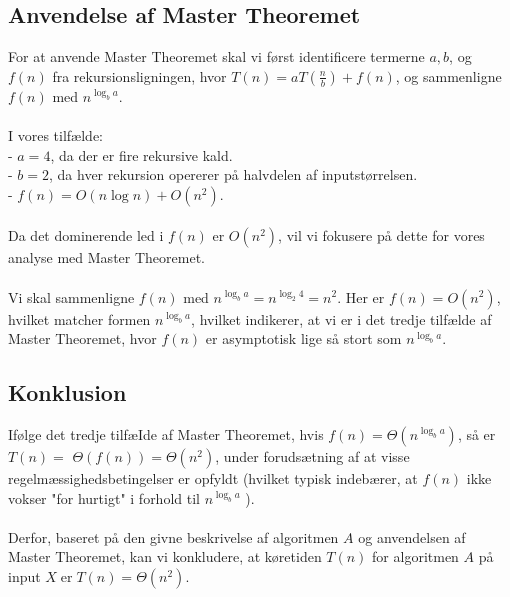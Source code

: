\documentclass{article}
\begin{document}
\subsection{Anvendelse af Master Theoremet}
For at anvende Master Theoremet skal vi først identificere termerne $a, b$, og $f(n)$ fra rekursionsligningen, hvor $T(n)=a T\left(\frac{n}{b}\right)+f(n)$, og sammenligne $f(n)$ med $n^{\log _b a}$.
\\
\\
I vores tilfælde:
\\
- $a=4$, da der er fire rekursive kald.
\\
- $b=2$, da hver rekursion opererer på halvdelen af inputstørrelsen.
\\
- $f(n)=O(n \log n)+O\left(n^2\right)$.
\\
\\
Da det dominerende led i $f(n)$ er $O\left(n^2\right)$, vil vi fokusere på dette for vores analyse med Master Theoremet.
\\
\\
Vi skal sammenligne $f(n)$ med $n^{\log _b a}=n^{\log _2 4}=n^2$. Her er $f(n)=O\left(n^2\right)$, hvilket matcher formen $n^{\log _b a}$, hvilket indikerer, at vi er i det tredje tilfælde af Master Theoremet, hvor $f(n)$ er asymptotisk lige så stort som $n^{\log _b a}$.

\subsection{Konklusion}
Ifølge det tredje tilfæIde af Master Theoremet, hvis $f(n)=\Theta\left(n^{\log _b a}\right)$, så er $T(n)=$ $\Theta(f(n))=\Theta\left(n^2\right)$, under forudsætning af at visse regelmæssighedsbetingelser er opfyldt (hvilket typisk indebærer, at $f(n)$ ikke vokser "for hurtigt" i forhold til $n^{\log _b a}$ ).
\\
\\
Derfor, baseret på den givne beskrivelse af algoritmen $A$ og anvendelsen af Master Theoremet, kan vi konkludere, at køretiden $T(n)$ for algoritmen $A$ på input $X \operatorname{er} T(n)=\Theta\left(n^2\right)$.
\end{document}
